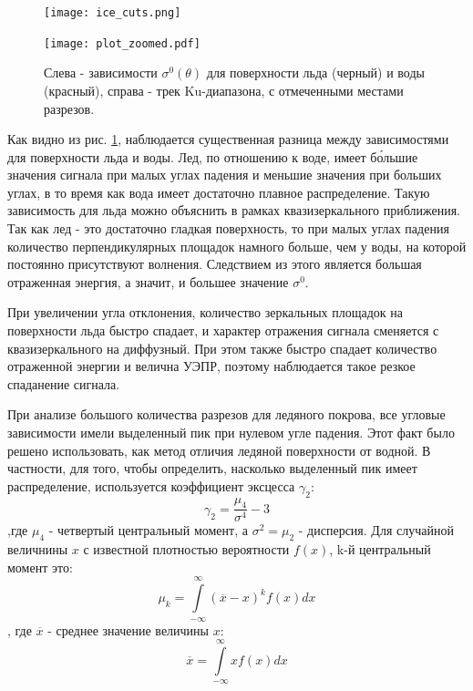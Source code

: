 \begin{figure}[h!]
  \centering
  \begin{minipage}{.49\linewidth}
    \texttt{[image: ice\_cuts.png]}
  \end{minipage}
  \begin{minipage}{.49\linewidth}
    \texttt{[image: plot\_zoomed.pdf]}
  \end{minipage}
  \caption{Слева - зависимости $\sigma^0(\theta)$ для поверхности льда (черный) и воды (красный), справа - трек Ku-диапазона, с отмеченными местами разрезов. }
  \label{fig:4}
\end{figure}

Как видно из рис. \ref{fig:4}, наблюдается существенная разница между зависимостями для поверхности льда и воды. Лед, по
отношению к воде, имеет б\'{о}льшие значения сигнала при малых углах падения и меньшие значения при больших углах, в то время как вода
имеет достаточно плавное распределение. Такую зависимость для льда можно объяснить в рамках
квазизеркального приближения. Так как лед - это достаточно гладкая поверхность, то при малых углах падения количество
перпендикулярных площадок намного больше, чем у воды, на которой постоянно присутствуют волнения. Следствием из этого
является большая отраженная энергия, а значит, и большее значение $\sigma^0$. 

При увеличении угла отклонения, количество зеркальных площадок на поверхности льда быстро спадает, и характер отражения сигнала
сменяется с квазизеркального на диффузный. При этом также быстро спадает количество отраженной энергии и велична УЭПР,
поэтому наблюдается такое резкое спаданение сигнала.

При анализе большого количества разрезов для ледяного покрова, все  угловые зависимости имели выделенный пик при нулевом
угле падения. Этот факт было решено использовать, как метод отличия ледяной поверхности от водной. В частности, для
того, чтобы определить, насколько выделенный пик имеет распределение, используется коэффициент эксцесса $\gamma_2$:
\begin{equation}
  \gamma_2 = \frac{\mu_4}{\sigma^4} -3
  \label{eq:5}
\end{equation}
,где $\mu_4$ - четвертый центральный момент, а $\sigma^2 = \mu_2$ - дисперсия. Для случайной величнины $x$ с известной плотностью вероятности $f(x)$, k-й
центральный момент это:
\begin{equation}
  \mu_k = \int \limits_{-\infty}^{\infty}(\overline{x}-x)^k f(x) dx
  \label{eq:6}
\end{equation} 
, где $\overline{x}$ - среднее значение величины $x$:
\begin{equation}
  \overline{x} = \int \limits_{-\infty}^{\infty}x f(x) dx
  \label{eq:7}
\end{equation}

